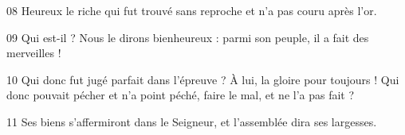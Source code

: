 08 Heureux le riche qui fut trouvé sans reproche et n’a pas couru après l’or.

09 Qui est-il ? Nous le dirons bienheureux : parmi son peuple, il a fait des merveilles !

10 Qui donc fut jugé parfait dans l’épreuve ? À lui, la gloire pour toujours ! Qui donc pouvait pécher et n’a point péché, faire le mal, et ne l’a pas fait ?

11 Ses biens s’affermiront dans le Seigneur, et l’assemblée dira ses largesses.
